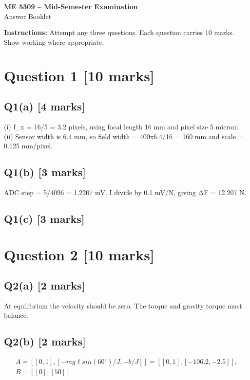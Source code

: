 \documentclass[11pt,a4paper]{article}
\begin{document}
\begin{center}
{\Large\bfseries ME 5309 -- Mid-Semester Examination}\\[3pt]
{\large Answer Booklet}\\[8pt]
\end{center}
\textbf{Instructions:} Attempt any three questions. Each question carries 10 marks. Show working where appropriate.
\section*{Question 1 \hfill [10 marks]}
\subsection*{Q1(a) \hfill [4 marks]}

(i) f\_x = 16/5 = 3.2 pixels, using focal length 16 mm and pixel size 5 microm.
(ii) Sensor width is 6.4 mm, so field width = 400x6.4/16 = 160 mm and scale = 0.125 mm/pixel.

\subsection*{Q1(b) \hfill [3 marks]}

ADC step = 5/4096 = 1.2207 mV.
I divide by 0.1 mV/N, giving ΔF = 12.207 N.

\subsection*{Q1(c) \hfill [3 marks]}

\vspace{2mm}

\section*{Question 2 \hfill [10 marks]}
\subsection*{Q2(a) \hfill [2 marks]}

At equilibrium the velocity should be zero.
The torque and gravity torque must balance.

\subsection*{Q2(b) \hfill [2 marks]}

\[\begin{aligned}A = [[0,1], [-mg\ell sin(60^{\circ})/J, -b/J]] = [[0,1], [-106.2, -2.5]],\\ B = [[0],[50]]\end{aligned}\]
\end{document}
